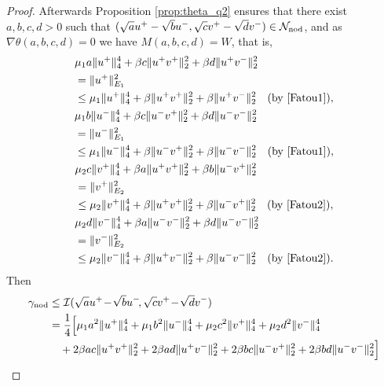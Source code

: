 \documentclass[reqno]{amsart}
\begin{document}
\begin{proof}
Afterwards  Proposition \ref{prop:theta_q2}  ensures that there exist $a,b,c,d>0$
such that $(\sqrt{a} u^+ - \sqrt{b}u^-, \sqrt{c} v^+ - \sqrt{d}v^-)
\in \mathcal N_{\rm nod}$, and as $\nabla \theta (a,b,c,d)=0$ we have $M(a,b,c,d)=W$,
that is,
\begin{equation}\label{atante}
\begin{gathered}
\begin{aligned}
& \mu_1 a\|u^+\|_4^4 + \beta c \|u^+v^+\|_2^2 + \beta d \|u^+v^-\|_2^2 \\
&= \|u^+\|_{E_1}^2 \\
&\le \mu_1 \|u^+\|_4^4 + \beta \|u^+v^+\|_2^2  + \beta \|u^+v^-\|_2^2
  \quad \text{(by  \eqref{Fatou1})} ,
\end{aligned}\\
\begin{aligned}
&\mu_1 b\|u^-\|_4^4 + \beta c \|u^-v^+\|_2^2 + \beta d \|u^-v^-\|_2^2  \\
&= \|u^-\|_{E_1}^2 \\
&\leq  \mu_1 \|u^-\|_4^4 + \beta \|u^-v^+\|_2^2   + \beta \|u^-v^-\|_2^2 \quad
\text{(by \eqref{Fatou1})},
\end{aligned}\\
\begin{aligned}
&\mu_2 c\|v^+\|_4^4 + \beta a \|u^+v^+\|_2^2 + \beta b \|u^-v^+\|_2^2 \\
&= \|v^+\|_{E_2}^2  \\
&\leq \mu_2 \|v^+\|_4^4 + \beta \|u^+v^+\|_2^2  + \beta \|u^-v^+\|_2^2 \quad
\text{(by \eqref{Fatou2})},
\end{aligned} \\
\begin{aligned}
&\mu_2 d\|v^-\|_4^4 + \beta a \|u^-v^-\|_2^2 + \beta d \|u^-v^-\|_2^2 \\
& = \|v^-\|_{E_2}^2 \\
&\leq \mu_2 \|v^-\|_4^4 + \beta \|u^+v^-\|_2^2  + \beta \|u^-v^-\|_2^2 \quad
\text{(by \eqref{Fatou2})}.
\end{aligned}
\end{gathered}
\end{equation}
Then
 \begin{align*}
\gamma_{\rm nod}
&\leq  \mathcal I (\sqrt{a} u^+ \!-\!\sqrt{b}u^-\!, \sqrt{c} v^+ \!-\!\sqrt{d} v^-)\\
&=\frac{1}4\Big[\mu_1 a^2\|u^+\|_4^4 +\mu_1 b^2\|u^-\|_4^4
 + \mu_2 c^2\|v^+\|_4^4 + \mu_2 d^2\|v^-\|_4^4 \\
& \quad   +2\beta ac \|u^+ v^+\|_2^2 + 2\beta ad \|u^+ v^-\|_2^2
  + 2\beta bc\|u^- v^+\|_2^2 + 2\beta bd \|u^- v^-\|_2^2 \Big] \\

\end{align*}
\end{proof}
\end{document}
